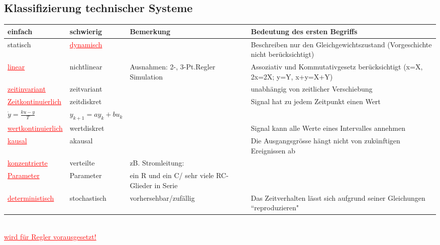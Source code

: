 		\subsection{Klassifizierung technischer Systeme}
		\begin{tabular}{|l|l|p{6cm}|p{6cm}|}
        	\hline
        	
        	einfach &
        	schwierig &
        	Bemerkung &
        	Bedeutung des \textbf{ersten} Begriffs\\
        	\hline
        	
        	statisch &
        	\textcolor{red}{\underline{dynamisch}} &
        	&
        	Beschreiben nur den Gleichgewichtszustand (Vorgeschichte nicht
        	berücksichtigt)\\
        	\hline
        	
        	\textcolor{red}{\underline{linear}}	&
        	nichtlinear &
        	Ausnahmen: 2-, 3-Pt.Regler Simulation &
        	Assoziativ und Kommutativgesetz berücksichtigt \newline (x=X, 2x=2X;
        	y=Y, x+y=X+Y)\\
        	\hline
        	
        	\textcolor{red}{\underline{zeitinvariant}} &
        	zeitvariant &
        	&
        	unabhängig von zeitlicher Verschiebung \\
        	\hline
        	
        	\textcolor{red}{\underline{Zeitkontinuierlich}} &
        	zeitdiskret &
        	&
        	Signal hat zu jedem Zeitpunkt einen Wert\\
        	$\dot{y}=\frac{ku-y}{T}$ &
        	$y_{k+1}=a y_k + b u_k$	&
        	&
        	\\
        	\hline
        	
        	\textcolor{red}{\underline{wertkontinuierlich}}&
        	wertdiskret&
        	&
        	Signal kann alle Werte eines Intervalles annehmen\\
        	\hline
        	
        	\textcolor{red}{\underline{kausal}}	&
        	akausal	&
        	&
        	Die Ausgangsgrösse hängt nicht von zukünftigen Ereignissen ab\\
        	\hline
        	
        	\textcolor{red}{\underline{konzentrierte}} &
        	verteilte &
        	zB.	Stromleitung: &
        	\\
        	\textcolor{red}{\underline{Parameter}} &
        	Parameter	&
        	ein R und ein C/ sehr viele RC-Glieder in Serie &
        	\\
        	\hline
        	
        	\textcolor{red}{\underline{deterministisch}}	&
        	stochastisch &
        	vorhersehbar/zufällig &
        	Das Zeitverhalten lässt sich aufgrund seiner Gleichungen
        	``reproduzieren"\\
        	\hline
        \end{tabular}\\
				\textcolor{red}{\underline{wird für Regler vorausgesetzt!}}
